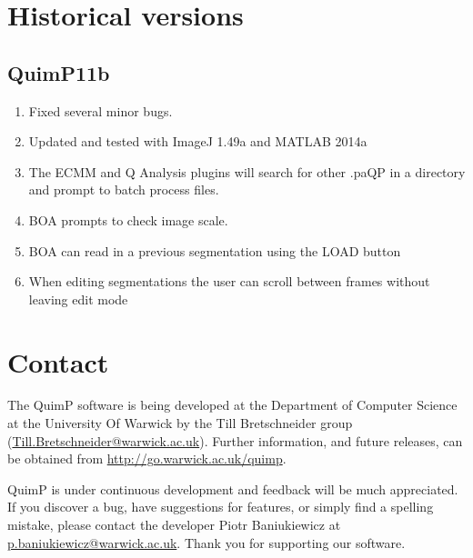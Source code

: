 \documentclass[a4paper,12pt]{article}
\begin{document}
\section {Historical versions}

\subsection{QuimP11b}

\begin{enumerate}
	\item Fixed several minor bugs.
	\item Updated and tested with ImageJ 1.49a and MATLAB 2014a
	\item The ECMM and Q Analysis plugins will search for other .paQP in a directory and prompt to batch process files.
	\item BOA prompts to check image scale.
	\item BOA can read in a previous segmentation using the LOAD button
	\item When editing segmentations the user can scroll between frames without leaving edit mode
\end{enumerate}

\section{Contact}

The QuimP software is being developed at the Department of Computer Science at the University Of Warwick by the Till Bretschneider group (\href{mailto:till.bretschneider@warwick.ac.uk}{Till.Bretschneider@warwick.ac.uk}).
Further information, and future releases, can be obtained from \url{http://go.warwick.ac.uk/quimp}.

QuimP is under continuous development and feedback will be much appreciated.  If you discover a bug, have suggestions 
for features, or simply find a spelling mistake, please contact the developer Piotr Baniukiewicz at \href{mailto:p.baniukiewicz@warwick.ac.uk}{p.baniukiewicz@warwick.ac.uk}. Thank you for supporting our software. 

 
\end{document}
